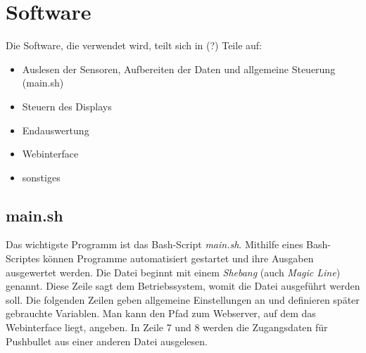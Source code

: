 \chapter{Software}
Die Software, die verwendet wird, teilt sich in (?) Teile auf:
\begin{itemize}
\item Auslesen der Sensoren, Aufbereiten der Daten und allgemeine Steuerung (main.sh)
\item Steuern des Displays
\item Endauswertung
\item Webinterface
\item sonstiges
\end{itemize}

\section{main.sh}
\label{sec:main.sh}

Das wichtigste Programm ist das Bash-Script \textit{main.sh}. Mithilfe eines Bash-Scriptes können Programme automatisiert gestartet und ihre Ausgaben ausgewertet werden.
Die Datei beginnt mit einem \textit{Shebang} (auch \textit{Magic Line}) genannt. Diese Zeile sagt dem Betriebssystem, womit die Datei ausgeführt werden soll.
Die folgenden Zeilen geben allgemeine Einstellungen an und definieren später gebrauchte Variablen. Man kann den Pfad zum Webserver, auf dem das Webinterface liegt, angeben. In Zeile 7 und 8 werden die Zugangsdaten für Pushbullet aus einer anderen Datei ausgelesen. 
